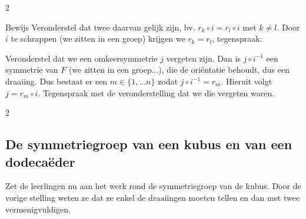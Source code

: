 \begin{multicols}{2}
\begin{kader}{Bewijs}{}
    Veronderstel dat twee daarvan gelijk zijn, bv. $r_k\circ i= r_l\circ i$ met $k\ne l$. Door $i$ te schrappen (we zitten in een groep) krijgen we $r_k=r_l$, tegenspraak.
    
    Veronderstel dat we een omkeersymmetrie $j$ vergeten zijn. Dan is $j\circ i^{-1}$ een symmetrie van $F$ (we zitten in een groep...), die de oriëntatie behoudt, dus een draaiing. Dus bestaat er een $m\in \{1,...n\}$ zodat $j\circ i^{-1}=r_m$. Hieruit volgt $j=r_m\circ i$. Tegenspraak met de veronderstelling dat we die vergeten waren.

\end{kader}
\end{multicols}
\begin{multicols}{2}
\subsection{De symmetriegroep van een kubus en van een dodecaëder}
	
Zet de leerlingen nu aan het werk rond de symmetriegroep van de kubus. Door de vorige stelling weten ze dat ze enkel de draaiingen moeten tellen en dan met twee vermenigvuldigen.

\end{multicols}

